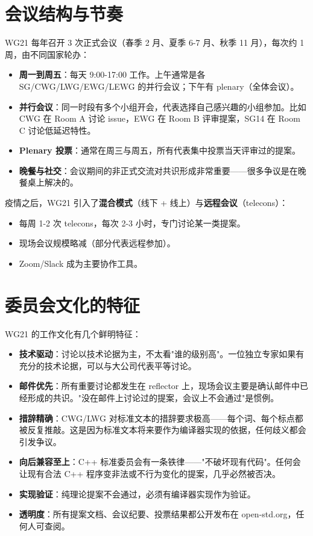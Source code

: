 \documentclass[12pt,a4paper,fontset=fandol]{ctexbook}
\begin{document}
\section{会议结构与节奏}

WG21 每年召开 3 次正式会议（春季 2 月、夏季 6-7 月、秋季 11 月），每次约 1 周，由不同国家轮办：

\begin{itemize}
  \item \textbf{周一到周五}：每天 9:00-17:00 工作。上午通常是各 SG/CWG/LWG/EWG/LEWG 的并行会议；下午有 plenary（全体会议）。
  \item \textbf{并行会议}：同一时段有多个小组开会，代表选择自己感兴趣的小组参加。比如 CWG 在 Room A 讨论 issue，EWG 在 Room B 评审提案，SG14 在 Room C 讨论低延迟特性。
  \item \textbf{Plenary 投票}：通常在周三与周五，所有代表集中投票当天评审过的提案。
  \item \textbf{晚餐与社交}：会议期间的非正式交流对共识形成非常重要——很多争议是在晚餐桌上解决的。
\end{itemize}

疫情之后，WG21 引入了\textbf{混合模式}（线下 + 线上）与\textbf{远程会议}（telecons）：

\begin{itemize}
  \item 每周 1-2 次 telecons，每次 2-3 小时，专门讨论某一类提案。
  \item 现场会议规模略减（部分代表远程参加）。
  \item Zoom/Slack 成为主要协作工具。
\end{itemize}

\section{委员会文化的特征}

WG21 的工作文化有几个鲜明特征：

\begin{itemize}
  \item \textbf{技术驱动}：讨论以技术论据为主，不太看"谁的级别高"。一位独立专家如果有充分的技术论据，可以与大公司代表平等讨论。
  \item \textbf{邮件优先}：所有重要讨论都发生在 reflector 上，现场会议主要是确认邮件中已经形成的共识。"没在邮件上讨论过的提案，会议上不会通过"是惯例。
  \item \textbf{措辞精确}：CWG/LWG 对标准文本的措辞要求极高——每个词、每个标点都被反复推敲。这是因为标准文本将来要作为编译器实现的依据，任何歧义都会引发争议。
  \item \textbf{向后兼容至上}：C++ 标准委员会有一条铁律——"不破坏现有代码"。任何会让现有合法 C++ 程序变非法或不行为变化的提案，几乎必然被否决。
  \item \textbf{实现验证}：纯理论提案不会通过，必须有编译器实现作为验证。
  \item \textbf{透明度}：所有提案文档、会议纪要、投票结果都公开发布在 open-std.org，任何人可查阅。
\end{itemize}
\end{document}
